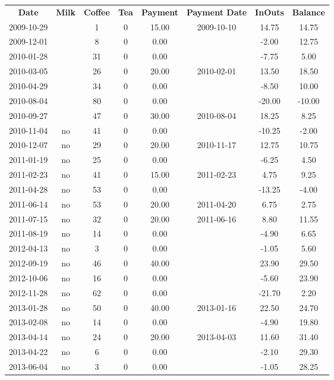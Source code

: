 \begin{center}
\begin{tabular}{cccccccc}
\textbf{Date} & \textbf{Milk} & \textbf{Coffee} & \textbf{Tea} & \textbf{Payment} & \textbf{Payment Date} & \textbf{InOuts} & \textbf{Balance} \\
2009-10-29 &  &  1 & 0 & 15.00 & 2009-10-10 &  14.75 &  14.75\\ 
2009-12-01 &  &  8 & 0 &  0.00 &  &  -2.00 &  12.75\\ 
2010-01-28 &  & 31 & 0 &  0.00 &  &  -7.75 &   5.00\\ 
2010-03-05 &  & 26 & 0 & 20.00 & 2010-02-01 &  13.50 &  18.50\\ 
2010-04-29 &  & 34 & 0 &  0.00 &  &  -8.50 &  10.00\\ 
2010-08-04 &  & 80 & 0 &  0.00 &  & -20.00 & -10.00\\ 
2010-09-27 &  & 47 & 0 & 30.00 & 2010-08-04 &  18.25 &   8.25\\ 
2010-11-04 & no & 41 & 0 &  0.00 &  & -10.25 &  -2.00\\ 
2010-12-07 & no & 29 & 0 & 20.00 & 2010-11-17 &  12.75 &  10.75\\ 
2011-01-19 & no & 25 & 0 &  0.00 &  &  -6.25 &   4.50\\ 
2011-02-23 & no & 41 & 0 & 15.00 & 2011-02-23 &   4.75 &   9.25\\ 
2011-04-28 & no & 53 & 0 &  0.00 &  & -13.25 &  -4.00\\ 
2011-06-14 & no & 53 & 0 & 20.00 & 2011-04-20 &   6.75 &   2.75\\ 
2011-07-15 & no & 32 & 0 & 20.00 & 2011-06-16 &   8.80 &  11.55\\ 
2011-08-19 & no & 14 & 0 &  0.00 &  &  -4.90 &   6.65\\ 
2012-04-13 & no &  3 & 0 &  0.00 &  &  -1.05 &   5.60\\ 
2012-09-19 & no & 46 & 0 & 40.00 &  &  23.90 &  29.50\\ 
2012-10-06 & no & 16 & 0 &  0.00 &  &  -5.60 &  23.90\\ 
2012-11-28 & no & 62 & 0 &  0.00 &  & -21.70 &   2.20\\ 
2013-01-28 & no & 50 & 0 & 40.00 & 2013-01-16 &  22.50 &  24.70\\ 
2013-02-08 & no & 14 & 0 &  0.00 &  &  -4.90 &  19.80\\ 
2013-04-14 & no & 24 & 0 & 20.00 & 2013-04-03 &  11.60 &  31.40\\ 
2013-04-22 & no &  6 & 0 &  0.00 &  &  -2.10 &  29.30\\ 
2013-06-04 & no &  3 & 0 &  0.00 &  &  -1.05 &  28.25
\end{tabular}
\end{center}

